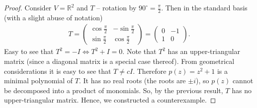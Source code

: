 \documentclass{extarticle}
\begin{document}
\begin{proof}
Consider $ V = \mathbb{R}^{2} $ and $ T $ -- rotation by $ 90^{ \circ} = \frac{\pi}{2} $.
Then in the standard basis (with a slight abuse of notation)
\begin{gather*}
    T =
    \begin{pmatrix}
        \cos \frac{\pi}{2} & -\sin \frac{\pi}{2} \\ 
        \sin \frac{\pi}{2} & \cos \frac{\pi}{2} 
    \end{pmatrix} =
    \begin{pmatrix}
        0 & -1 \\ 
        1 & 0
    \end{pmatrix} .
\end{gather*}
Easy to see that $ T^{2} = -I \iff T^{2} + I = 0 $.
Note that $ T^{2} $ has an upper-triangular matrix (since a diagonal matrix is a special case
thereof).
From geometrical considerations it is easy
to see that $ T \ne cI $. Therefore $ p(z) = z^{2} +1 $ is a minimal polynomial of $ T $.
It has no real roots (the roots are $ \pm i $), so $ p(z) $ cannot be decomposed into a product 
of monomials. So, by the previous result, $ T $ has no upper-triangular matrix.
Hence, we constructed a counterexample.

%




\end{proof}
\end{document}
